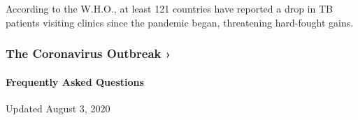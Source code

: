 According to the W.H.O., at least 121 countries have reported a drop in
TB patients visiting clinics since the pandemic began, threatening
hard-fought gains.

\href{https://www.nytimes.com/news-event/coronavirus?action=click\&pgtype=Article\&state=default\&region=MAIN_CONTENT_3\&context=storylines_faq}{}

\hypertarget{the-coronavirus-outbreak-}{%
\subsubsection{The Coronavirus Outbreak
›}\label{the-coronavirus-outbreak-}}

\hypertarget{frequently-asked-questions}{%
\paragraph{Frequently Asked
Questions}\label{frequently-asked-questions}}

Updated August 3, 2020

